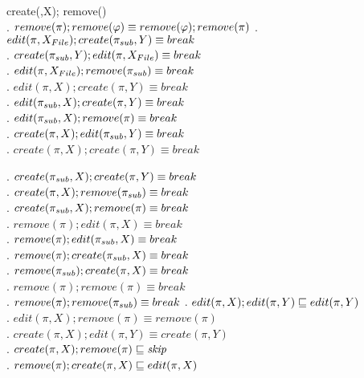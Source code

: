\begin{table}[H]
\begin{table}[thb]
{{{\begin{minipage}{8.3cm}
create(\pi,X); remove(\varphi)\)\\
\lawix. \(remove(\pi); remove(\varphi) \equiv\relax
remove(\varphi); remove(\pi)\)
\lawiia. \(edit(\pi,X_{File}); create(\pi_{sub},Y) \equiv
break\)\\
\lawiiap. \(create(\pi_{sub},Y); edit(\pi,X_{File}) \equiv
break\)\\
\lawiiib. \(edit(\pi,X_{File}); remove(\pi_{sub}) \equiv break\)\\
\lawx. \(edit(\pi,X); create(\pi,Y) \equiv break\)\\
\lawxi. \(edit(\pi_{sub},X); create(\pi,Y) \equiv break\)\\
\lawxii. \(edit(\pi_{sub},X); remove(\pi) \equiv break\)\\
\lawxiii. \(create(\pi,X); edit(\pi_{sub},Y) \equiv break\)\\
\lawxiv. \(create(\pi,X); create(\pi,Y) \equiv break\)\\
\end{minipage}\begin{minipage}{7.2cm}\setlength{\rightskip}{0cm plus 7cm}
\lawxv. \(create(\pi_{sub},X); create(\pi,Y) \equiv break\)\\
\lawxvi. \(create(\pi,X); remove(\pi_{sub}) \equiv break\)\\
\lawxvii. \(create(\pi_{sub},X); remove(\pi) \equiv break\)\\
\lawxviii. \(remove(\pi); edit(\pi,X) \equiv break\)\\
\lawxix. \(remove(\pi); edit(\pi_{sub},X) \equiv break\)\\
\lawxx. \(remove(\pi); create(\pi_{sub},X) \equiv break\)\\
\lawxxi. \(remove(\pi_{sub}); create(\pi,X) \equiv break\)\\
\lawxxii. \(remove(\pi); remove(\pi) \equiv break\)\\
\lawxxiii. \(remove(\pi); remove(\pi_{sub}) \equiv break\)
\lawxxiv. \(edit(\pi,X); edit(\pi,Y) \sqsubseteq edit(\pi,Y)\)\\
\lawxxv. \(edit(\pi,X); remove(\pi) \equiv remove(\pi)\)\\ 
\lawxxvi. \(create(\pi,X); edit(\pi,Y) \equiv create(\pi,Y)\)\\
\lawxxvii. \(create(\pi,X); remove(\pi) \sqsubseteq \mathit{skip}\)\\
\lawxxviii. \(remove(\pi); create(\pi,X) \sqsubseteq edit(\pi,X)\)

\end{minipage}}}}
\end{table}
\end{table}
